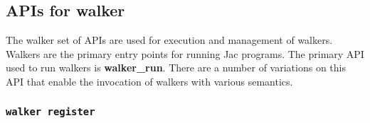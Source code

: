 \subsection{APIs for walker}

\par
The walker set of APIs are used for execution and management of walkers. Walkers
are the primary entry points for running Jac programs. The
primary API used to run walkers is \textbf{walker\_run}. There are a number of
variations on this API that enable the invocation of walkers with various
semantics.

\subsubsection{\lstinline[basicstyle=\Large\ttfamily]$walker register$}

